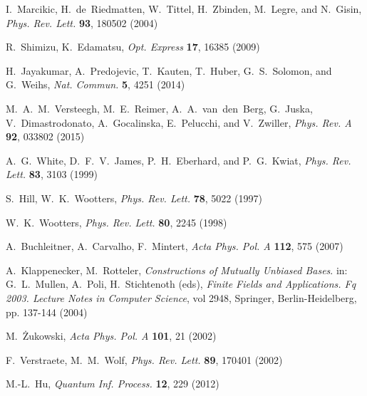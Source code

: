 \documentclass[aps,pra,reprint,groupedaddress,showkeys]{revtex4-1}
\begin{document}
\begin{thebibliography}{1}
I.~Marcikic, H.~de~Riedmatten, W.~Tittel, H.~Zbinden, M.~Legre, and N.~Gisin, \textit{Phys. Rev. Lett.} \textbf{93}, 180502 (2004) 

R.~Shimizu, K.~Edamatsu, \textit{Opt. Express} \textbf{17}, 16385 (2009) 

H.~Jayakumar, A.~Predojevic, T.~Kauten, T.~Huber, G.~S.~Solomon, and G.~Weihs, \textit{Nat. Commun.} \textbf{5}, 4251 (2014) 

M.~A.~M.~Versteegh, M.~E.~Reimer, A.~A.~van~den~Berg, G.~Juska, V.~Dimastrodonato, A.~Gocalinska, E.~Pelucchi, and V.~Zwiller, \textit{Phys. Rev. A} \textbf{92}, 033802 (2015) 

A.~G.~White, D.~F.~V.~James, P.~H.~Eberhard, and P.~G.~Kwiat, \textit{Phys. Rev. Lett.} \textbf{83}, 3103 (1999) 

S.~Hill, W.~K.~Wootters, \textit{Phys. Rev. Lett.} \textbf{78}, 5022 (1997) 

W.~K.~Wootters, \textit{Phys. Rev. Lett.} \textbf{80}, 2245 (1998) 

A.~Buchleitner, A.~Carvalho, F.~Mintert, \textit{Acta Phys. Pol. A} \textbf{112}, 575 (2007) 

A.~Klappenecker, M.~Rotteler, \textit{Constructions of Mutually Unbiased Bases}. in:  G.~L.~Mullen, A.~Poli, H.~Stichtenoth (eds), \textit{Finite Fields and Applications. Fq 2003. Lecture Notes in Computer Science}, vol 2948, Springer, Berlin-Heidelberg, pp. 137-144 (2004) 

M.~\.Zukowski,  \textit{Acta Phys. Pol. A} \textbf{101}, 21 (2002) 

F.~Verstraete, M.~M.~Wolf, \textit{Phys. Rev. Lett.} \textbf{89}, 170401 (2002) 

M.-L.~Hu, \textit{Quantum Inf. Process.} \textbf{12}, 229 (2012) 

\end{thebibliography}
\end{document}
